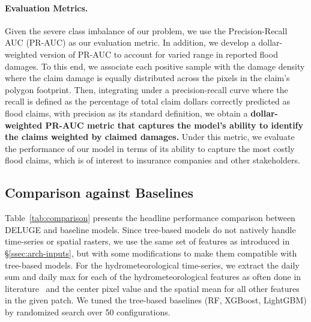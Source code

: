 \paragraph{Evaluation Metrics.}Given the severe class imbalance of our problem, we use the Precision-Recall AUC (PR-AUC) as our evaluation metric.
%
In addition, we develop a dollar-weighted version of PR-AUC to account for varied range in reported flood damages.
%
To this end, we associate each positive sample with the damage density where the claim damage is equally distributed across the pixels in the claim's polygon footprint.
%
Then, integrating under a precision-recall curve where the recall is defined as the percentage of total claim dollars correctly predicted as flood claims, with precision as its standard definition, we obtain a \textbf{dollar-weighted PR-AUC metric that captures the model's ability to identify the claims weighted by claimed damages.}
%
Under this metric, we evaluate the performance of our model in terms of its ability to capture the most costly flood claims, which is of interest to insurance companies and other stakeholders.

\vspace{-5pt}
\subsection{Comparison against Baselines}Table~\ref{tab:comparison} presents the headline performance comparison between DELUGE and baseline models.
%
Since tree-based models do not natively handle time-series or spatial rasters, we use the same set of features as introduced in \S\ref{ssec:arch-inputs}, but with some modifications to make them compatible with tree-based models.
%
For the hydrometeorological time-series, we extract the daily sum and daily max for each of the hydrometeorological features as often done in literature~\cite{yang_predicting_2022, alipour_leveraging_2020} and the center pixel value and the spatial mean for all other features in the given patch. 
%
We tuned the tree-based baselines (RF, XGBoost, LightGBM) by randomized search over 50 configurations.

